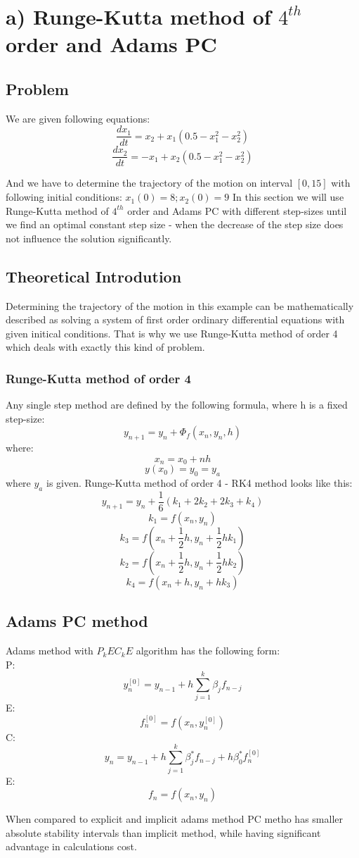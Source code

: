 \section{a) Runge-Kutta method of $4^{th}$ order and Adams PC}
\subsection{Problem}
We are given following equations:
\[ \frac{dx_1}{dt} = x_2 + x_1(0.5 - x_1^2 - x_2^2) \]
\[ \frac{dx_2}{dt} = -x_1 + x_2(0.5 - x_1^2 - x_2^2) \]

And we have to determine the trajectory of the motion on interval $[0, 15]$ with following initial conditions:
$ x_1(0) = 8; x_2(0) = 9 $
In this section we will use Runge-Kutta method of $4^{th}$ order and Adams PC with different step-sizes until we find an optimal constant step size - when the decrease of the step size does not influence the solution significantly.

\subsection{Theoretical Introdution}
Determining the trajectory of the motion in this example can be mathematically described as solving a system of first order ordinary differential equations with given initical conditions. That is why we use Runge-Kutta method of order 4 which deals with exactly this kind of problem.
\subsubsection{Runge-Kutta method of order 4}
Any single step method are defined by the following formula, where h is a fixed step-size:
\[ y_{n+1} = y_n + \Phi_f(x_n, y_n, h) \]
where:
\[ x_n = x_0 + nh \]
\[ y(x_0) = y_0 = y_a \]
where $y_a$ is given.
Runge-Kutta method of order 4 - RK4 method looks like this:
\[ y_{n+1} = y_n + \frac{1}{6}(k_1 + 2k_2+2k_3+k_4) \]
\[ k_1 = f(x_n, y_n) \]
\[ k_3 = f(x_n + \frac{1}{2}h, y_n + \frac{1}{2}hk_1) \]
\[ k_2 = f(x_n + \frac{1}{2}h, y_n + \frac{1}{2}hk_2) \]
\[ k_4 = f(x_n + h, y_n + hk_3) \]


\subsection{Adams PC method}
Adams method with $P_kEC_kE$ algorithm has the following form: \\
P: \[  y_n^{[0]} = y_{n-1} + h\sum_{j=1}^k \beta_jf_{n-j} \]
E: \[  f_n^{[0]} = f(x_n, y_n^{[0]}) \]
C: \[  y_n = y_{n-1} + h \sum_{j=1}^k \beta_j^* f_{n-j} + h \beta_0^* f_n^{[0]}\]
E: \[  f_n = f(x_n, y_n) \]

When compared to explicit and implicit adams method PC metho has smaller absolute stability intervals than implicit method, while having significant advantage in calculations cost.



